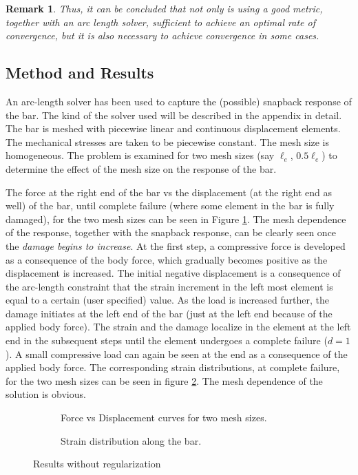 \documentclass[11pt]{elsarticle}
\newtheorem*{remark}{Remark}
\begin{document}
\begin{remark}
Thus, it can be concluded that not only is using a \textit{good} metric, together with an arc length solver, sufficient to achieve an optimal rate of convergence, but it is also necessary to achieve convergence in some cases.
\end{remark}

\subsection{Method and Results}

An arc-length solver has been used to capture the (possible) snapback response of the bar. The kind of the solver used will be described in the appendix in detail. The bar is meshed with piecewise linear and continuous displacement elements. The mechanical stresses are taken to be piecewise constant. The mesh size is homogeneous. The problem is examined for two mesh sizes (say $\ell_e$, $0.5 \ell_e$) to determine the effect of the mesh size on the response of the bar.

The force at the right end of the bar vs the displacement (at the right end as well) of the bar, until complete failure (where some element in the bar is fully damaged), for the two mesh sizes can be seen in Figure \ref{force_disp_local}. The mesh dependence of the response, together with the snapback response, can be clearly seen once the \textit{damage begins to increase}. At the first step, a compressive force is developed as a consequence of the body force, which gradually becomes positive as the displacement is increased. The initial negative displacement is a consequence of the arc-length constraint that the strain increment in the left most element is equal to a certain (user specified) value. As the load is increased further, the damage initiates at the left end of the bar (just at the left end because of the applied body force). The strain and the damage localize in the element at the left end in the subsequent steps until the element undergoes a complete failure ($d=1$). A small compressive load can again be seen at the end as a consequence of the applied body force. The corresponding strain distributions, at complete failure, for the two mesh sizes can be seen in figure \ref{strain_dist_local}. The mesh dependence of the solution is obvious.

\begin{figure}[ht]
	\begin{subfigure}{0.45\textwidth}
		\centering
		
		\caption{Force vs Displacement curves for two mesh sizes.}
		\label{force_disp_local}
	\end{subfigure}
	\hfill
	\begin{subfigure}{0.45\textwidth}
		\centering
		
		\caption{Strain distribution along the bar.}
		\label{strain_dist_local}
	\end{subfigure}
	\caption{Results without regularization}
	\label{fig:Results_without_regularization}
\end{figure}
\end{document}
